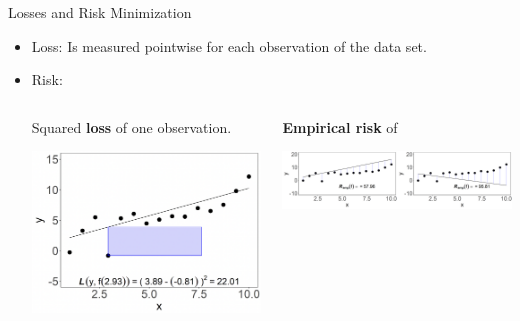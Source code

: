 \documentclass[11pt,compress,t,notes=noshow, xcolor=table]{beamer}
\begin{document}
\begin{vbframe}{Losses and Risk Minimization}

\begin{itemize}
\item Loss: Is measured pointwise for each observation of the data set. 

\item Risk: 

\begin{columns}  
\begin{column}{0.3\textwidth} 
\small Squared \textbf{loss} of one observation.

  \begin{center}
    \includegraphics[width=\textwidth]{slides/ml-basics/figure_man/nutshell_ml_basic_1_loss_sqrd.png} 
  \end{center}
\end{column}  


\begin{column}{0.7\textwidth} 
\small \textbf{Empirical risk} of 

  \begin{center}
    \includegraphics[width=\textwidth]{slides/ml-basics/figure/ml-basic_riskmin-2-risk.png} 
  \end{center}
\end{column} 
\end{columns}
\end{itemize}


\end{vbframe}
\end{document}
